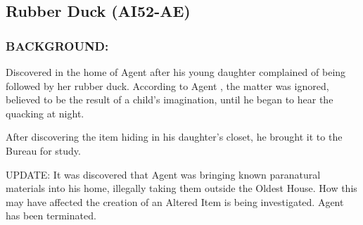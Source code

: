 \subsection*{Rubber Duck (AI52-AE)}
\subsubsection*{BACKGROUND:}
\par Discovered in the home of Agent 
after his young daughter complained of being followed by her rubber duck.
According to Agent , the matter was ignored,
believed to be the result of a child's imagination, until he began to
hear the quacking at night.
\par After discovering the item hiding in his daughter's closet, he
brought it to the Bureau for study.
\par UPDATE: It was discovered that Agent 
was bringing known paranatural materials into his home, illegally taking
them outside the Oldest House. How this may have affected the
creation of an Altered Item is being investigated. Agent 
has been terminated.